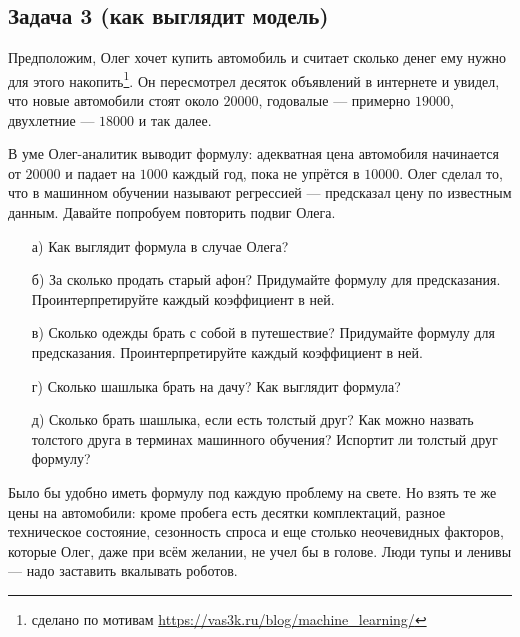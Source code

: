 \documentclass[12pt, a4paper, oneside]{article}
\begin{document}
\subsection*{Задача 3 (как выглядит модель)}

Предположим, Олег хочет купить автомобиль и считает сколько денег ему нужно для этого накопить\footnote{сделано по мотивам \url{https://vas3k.ru/blog/machine_learning/}}. Он пересмотрел десяток объявлений в интернете и увидел, что новые автомобили стоят около $20 000$, годовалые — примерно $19 000$, двухлетние — $18 000$ и так далее.

В уме Олег-аналитик выводит формулу: адекватная цена автомобиля начинается от $20 000$ и падает на $1000$ каждый год, пока не упрётся в $10 000$. Олег сделал то, что в машинном обучении называют регрессией — предсказал цену по известным данным. Давайте попробуем повторить подвиг Олега.

\begin{enumerate}
	\item[а)] Как выглядит формула в случае Олега?
	\item[б)] За сколько продать старый афон? Придумайте формулу для предсказания. Проинтерпретируйте каждый коэффициент в ней. 
	\item[в)] Сколько одежды брать с собой в путешествие?  Придумайте формулу для предсказания. Проинтерпретируйте каждый коэффициент в ней. 
	\item[г)] Сколько шашлыка брать на дачу? Как выглядит формула?
	\item[д)] Сколько брать шашлыка, если есть толстый друг? Как можно назвать толстого друга в терминах машинного обучения? Испортит ли толстый друг формулу?
\end{enumerate}

Было бы удобно иметь формулу под каждую проблему на свете. Но взять те же цены на автомобили: кроме пробега есть десятки комплектаций, разное техническое состояние, сезонность спроса и еще столько неочевидных факторов, которые Олег, даже при всём желании, не учел бы в голове. Люди тупы и ленивы — надо заставить вкалывать роботов.
\end{document}
